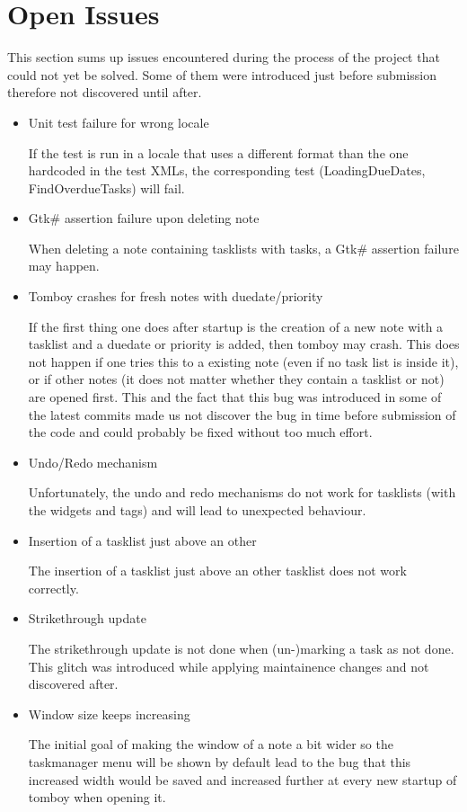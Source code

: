 \section{Open Issues}
\label{issues}

This section sums up issues encountered during the process of the project that could not yet be solved.
Some of them were introduced just before submission therefore not discovered until after.

\begin{itemize}
\item Unit test failure for wrong locale

  If the test is run in a locale that uses a different format than the one hardcoded in the test XMLs, the corresponding test (LoadingDueDates, FindOverdueTasks) will fail.

\item Gtk\# assertion failure upon deleting note

  When deleting a note containing tasklists with tasks, a Gtk\# assertion failure may happen.

\item Tomboy crashes for fresh notes with duedate/priority

  If the first thing one does after startup is the creation of a new note with a tasklist and a duedate or priority is added, then tomboy may crash. This does not happen if one tries this to a existing note (even if no task list is inside it), or if other notes (it does not matter whether they contain a tasklist or not) are opened first. 
This and the fact that this bug was introduced in some of the latest commits made us not discover the bug in time before submission of the code and could probably be fixed without too much effort.

\item Undo/Redo mechanism

  Unfortunately, the undo and redo mechanisms do not work for tasklists (with the widgets and tags) and will lead to unexpected behaviour.

\item Insertion of a tasklist just above an other

  The insertion of a tasklist just above an other tasklist does not work correctly.

\item Strikethrough update
  
  The strikethrough update is not done when (un-)marking a task as not done.
  This glitch was introduced while applying maintainence changes and not discovered after.

\item Window size keeps increasing

  The initial goal of making the window of a note a bit wider so the taskmanager menu will be shown by default lead to the bug that this increased width would be saved and increased further at every new startup of tomboy when opening it.

\end{itemize}